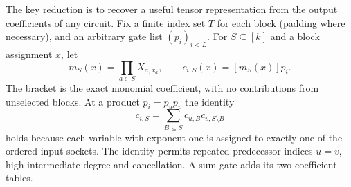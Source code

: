 \documentclass[11pt,letterpaper]{article}
\theoremstyle{definition}\newtheorem{definition}[theorem]{Definition}\newtheorem{example}[theorem]{Example}
\theoremstyle{remark}\newtheorem{remark}[theorem]{Remark}
\begin{document}
The key reduction is to recover a useful tensor representation from the output coefficients of any circuit. Fix a finite index set $T$ for each block (padding where necessary), and an arbitrary gate list $(p_i)_{i<L}$. For $S\subseteq[k]$ and a block assignment $x$, let
\[
 m_S(x)=\prod_{a\in S}X_{a,x_a},\qquad c_{i,S}(x)=[m_S(x)]p_i.
\]
The bracket is the exact monomial coefficient, with no contributions from unselected blocks. At a product $p_i=p_u p_v$ the identity
\begin{equation}\label{eq:split}
 c_{i,S}=\sum_{B\subseteq S}c_{u,B}c_{v,S\setminus B}
\end{equation}
holds because each variable with exponent one is assigned to exactly one of the ordered input sockets. The identity permits repeated predecessor indices $u=v$, high intermediate degree and cancellation. A sum gate adds its two coefficient tables.
\end{document}
